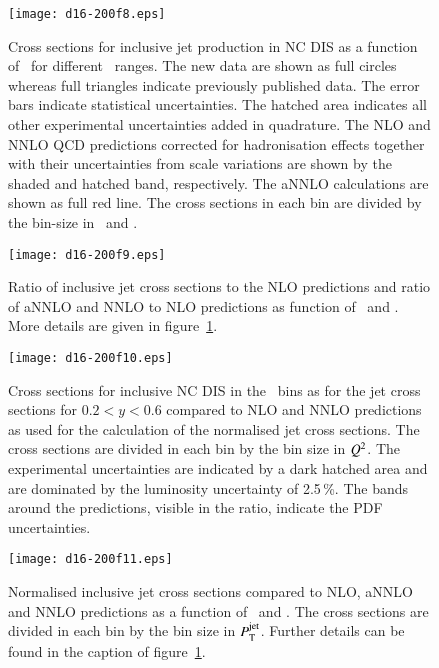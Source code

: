\documentclass[12pt]{article}
\begin{document}
\begin{figure}[htbp]
  \centering
  \texttt{[image: d16-200f8.eps]}
  \caption{
    Cross sections for inclusive jet production in NC DIS as a function of \ptjet\ for different \Qsq\ ranges.
    The new data are shown as full circles whereas full triangles indicate previously published data.
    The error bars indicate statistical uncertainties.
    The hatched area indicates all other experimental uncertainties added in quadrature.
    The NLO and NNLO QCD predictions corrected for hadronisation effects together with their uncertainties from scale variations are shown by the shaded and hatched band, respectively.
    The aNNLO calculations are shown as full red line.
    The cross sections in each bin are divided by the bin-size in \ptjet\ and \Qsq.
  }
  \label{figInclJet}
\end{figure}

\begin{figure}[htbp]
  \centering
  \texttt{[image: d16-200f9.eps]}
  \caption{
    Ratio of inclusive jet cross sections to the NLO predictions and ratio of aNNLO 
    and NNLO to NLO predictions as function of \Qsq\ and \ptjet.
    More details are given in figure~\ref{figInclJet}.
  }
  \label{figInclJetRatio}
\end{figure}



\begin{figure}
  \centering
  \texttt{[image: d16-200f10.eps]}
  \caption{
    Cross sections for inclusive NC DIS in the \Qsq\ bins as for the jet cross sections 
    for $0.2<y<0.6$ compared to NLO and NNLO predictions as used for the calculation of the normalised jet cross sections.
    The cross sections are divided in each bin by the bin size in $\Qsq$.
    The experimental uncertainties are indicated by a dark hatched area
    and are dominated by the luminosity uncertainty of 2.5\,\%. The bands
    around the predictions, visible in the ratio, indicate the PDF
    uncertainties.
  }
  \label{figNCDIS}
\end{figure}


\begin{figure}[htbp]
  \centering
  \texttt{[image: d16-200f11.eps]}
  \caption{
    Normalised inclusive jet cross sections compared to NLO, aNNLO and NNLO predictions as a function of \Qsq\ and \ptjet.
    The cross sections are divided in each bin by the bin size in $\ptjet$.
    Further details can be found in the caption of figure~\ref{figInclJet}.
  }
  \label{figNormInclJet}
\end{figure}
\end{document}
